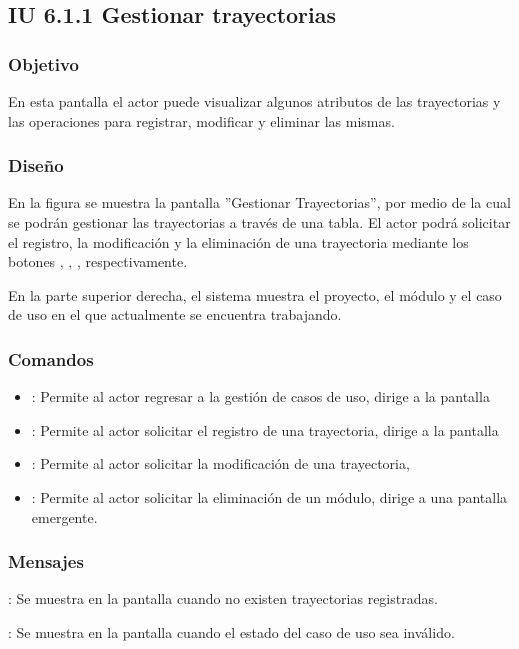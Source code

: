 \subsection{IU 6.1.1 Gestionar trayectorias}

\subsubsection{Objetivo}
	En esta pantalla el actor puede visualizar algunos atributos de las trayectorias y las operaciones para registrar, modificar y eliminar las mismas.
\subsubsection{Diseño}
	En la figura  se muestra la pantalla ''Gestionar Trayectorias'', por medio de la cual se podrán gestionar las trayectorias a través de una tabla. El actor podrá solicitar el registro, la modificación y la eliminación de una trayectoria mediante los botones , \editar, \eliminar, respectivamente.
	
	En la parte superior derecha, el sistema muestra el proyecto, el módulo y el caso de uso en el que actualmente se encuentra trabajando.

\subsubsection{Comandos}
\begin{itemize}
	\item {}: Permite al actor regresar a la gestión de casos de uso, dirige a la pantalla 
	\item {}: Permite al actor solicitar el registro de una trayectoria, dirige a la pantalla 
	\item \editar [Modificar]: Permite al actor solicitar la modificación de una trayectoria, 
	\item \eliminar [Eliminar]: Permite al actor solicitar la eliminación de un módulo, dirige a una pantalla emergente.
\end{itemize}

\subsubsection{Mensajes}

\begin{Citemize}
	\item {}: Se muestra en la pantalla  cuando no existen trayectorias registradas.
	\item {}: Se muestra en la pantalla  cuando el estado del caso de uso sea inválido.
\end{Citemize}
